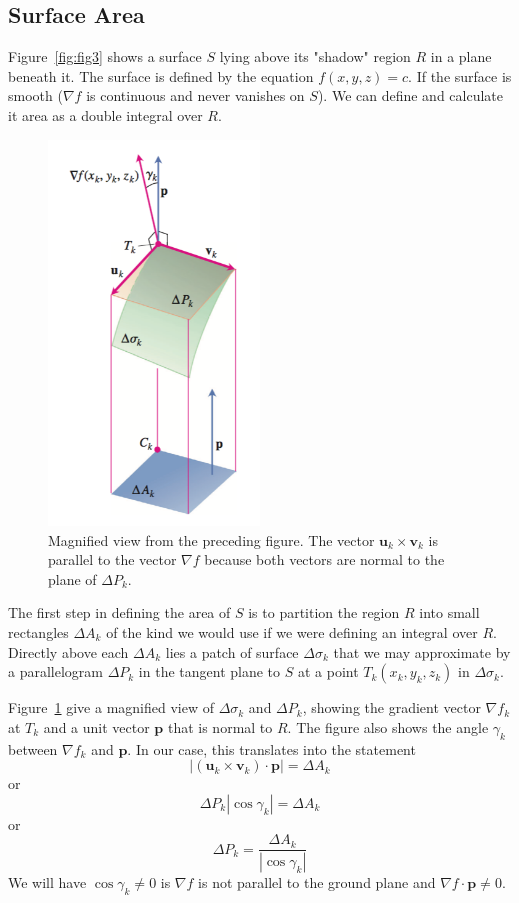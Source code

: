 \documentclass[a4paper,12pt]{article}
\begin{document}
\begin{CJK}{UTF8}{gbsn}
\subsection{Surface Area}
Figure~\ref{fig:fig3} shows a surface $S$ lying above its "shadow"
region $R$ in a plane beneath it. The surface is defined by the 
equation $f(x,y,z) = c$. If the surface is smooth ($\nabla f$ is continuous 
and never vanishes on $S$). We can define and calculate it area as a 
double integral over $R$.

\begin{figure}[htbp]
    \centering
    \includegraphics[height=0.8\textwidth, width=0.5\textwidth]{surface2.png}
    \caption{Magnified view from the preceding figure. The vector 
    $\bm{u}_k \times \bm{v}_k$  is parallel to the vector $\nabla f$ 
    because both vectors are normal to the plane of $\Delta P_k$.} 
    \label{fig:fig4}
\end{figure}

The first step in defining the area of $S$ is to partition the region 
$R$ into small rectangles $\Delta A_k$ of the kind we would use if we were 
defining an integral over $R$. Directly above each $\Delta A_k$ lies a patch 
of surface $\Delta \sigma_k$ that we may approximate by a parallelogram $\Delta P_k$
in the tangent plane to $S$ at a point $T_k(x_k,y_k,z_k)$ in $\Delta \sigma_k$.

Figure~\ref{fig:fig4} give a magnified view of $\Delta \sigma_k$ and $\Delta P_k$, showing the 
gradient vector $\nabla f_k$ at $T_k$ and a unit vector $\bm{p}$ that is 
normal to $R$. The figure also shows the angle $\gamma_k$ between $\nabla f_k$
and $\bm{p}$. In our case, this translates into the statement 
\[
    \left|\left(\bm{u}_k \times \bm{v}_k\right)\cdot\bm{p}\right| = \Delta A_k
\]
or 
\[
    \Delta P_k \left|\cos \gamma_k \right| = \Delta A_k
\]
or 
\[
    \Delta P_k = \frac{\Delta A_k}{\left|\cos \gamma_k \right|}
\]
We will have $\cos \gamma_k \ne 0$ is $\nabla f$ is not parallel to the ground plane 
and $\nabla f \cdot \bm{p} \ne 0$.


\end{CJK}
\end{document}

